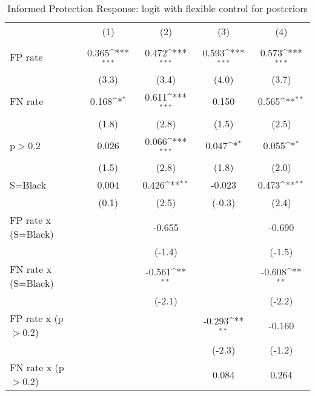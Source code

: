 \begin{table}[htbp]\centering
\def\sym#1{\ifmmode^{#1}\else\(^{#1}\)\fi}
\caption{Informed Protection Response: logit with flexible control for posteriors}
\begin{tabular}{l*{4}{c}}
\hline\hline
                &\multicolumn{1}{c}{(1)}&\multicolumn{1}{c}{(2)}&\multicolumn{1}{c}{(3)}&\multicolumn{1}{c}{(4)}\\
                &\multicolumn{1}{c}{}&\multicolumn{1}{c}{}&\multicolumn{1}{c}{}&\multicolumn{1}{c}{}\\
\hline
FP rate         &    0.365\sym{***}&    0.472\sym{***}&    0.593\sym{***}&    0.573\sym{***}\\
                &    (3.3)         &    (3.4)         &    (4.0)         &    (3.7)         \\
FN rate         &    0.168\sym{*}  &    0.611\sym{***}&    0.150         &    0.565\sym{**} \\
                &    (1.8)         &    (2.8)         &    (1.5)         &    (2.5)         \\
p$>$0.2         &    0.026         &    0.066\sym{***}&    0.047\sym{*}  &    0.055\sym{*}  \\
                &    (1.5)         &    (2.8)         &    (1.8)         &    (2.0)         \\
S=Black         &    0.004         &    0.426\sym{**} &   -0.023         &    0.473\sym{**} \\
                &    (0.1)         &    (2.5)         &   (-0.3)         &    (2.4)         \\
FP rate x (S=Black)&                  &   -0.655         &                  &   -0.690         \\
                &                  &   (-1.4)         &                  &   (-1.5)         \\
FN rate x (S=Black)&                  &   -0.561\sym{**} &                  &   -0.608\sym{**} \\
                &                  &   (-2.1)         &                  &   (-2.2)         \\
FP rate x (p$>$0.2)&                  &                  &   -0.293\sym{**} &   -0.160         \\
                &                  &                  &   (-2.3)         &   (-1.2)         \\
FN rate x (p$>$0.2)&                  &                  &    0.084         &    0.264         \\

\end{tabular}
\end{table}
